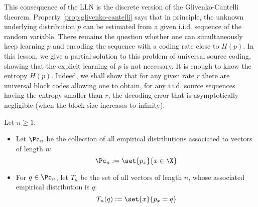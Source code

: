 \documentclass[toc]{../cs-classes/cs-classes}
\begin{document}
\begin{remark}
    This consequence of the LLN is the discrete version of the Glivenko-Cantelli theorem. Property \ref{prop:glivenko-cantelli} says that in principle, the unknown underlying distribution $p$ can be estimated from a given i.i.d. sequence of the random variable. There remains the question whether one can simultaneously keep learning $p$ and encoding the sequence with a coding rate close to $H(p)$. In this lesson, we give a partial solution to this problem of universal source coding, showing that the explicit learning of $p$ is not necessary. It is enough to know the entropy $H(p)$. Indeed, we shall show that for any given rate $r$ there are universal block codes allowing one to obtain, for any i.i.d. source sequences having the entropy smaller than $r$, the decoding error that is asymptotically negligible (when the block size increases to infinity).
\end{remark}

\begin{definition}
    Let $n\geq1$.
    \begin{itemize}
        \item Let $\Pc_n$ be the collection of all empirical distributions associated to vectors of length $n$:
        \begin{equation*}
            \Pc_n := \set{p_x}{x\in\X}
        \end{equation*}
        \item For $q\in\Pc_n$, let $T_n$ be the set of all vectors of length $n$, whose associated empirical distribution is $q$:
        \begin{equation*}
            T_n(q) := \set{x}{p_x=q}
        \end{equation*}
    \end{itemize}
\end{definition}
\end{document}
